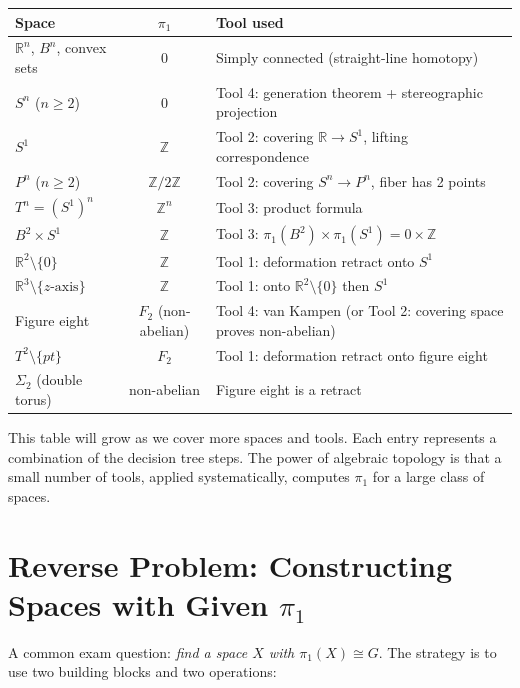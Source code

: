 \documentclass[11pt]{report}
\begin{document}
\begin{center}
\small
\begin{tabular}{|p{3.5cm}|c|p{5cm}|}
\hline
\textbf{Space} & $\pi_1$ & \textbf{Tool used} \\
\hline
$\mathbb{R}^n$, $B^n$, convex sets & $0$ & Simply connected (straight-line homotopy) \\
\hline
$S^n$ ($n \geq 2$) & $0$ & Tool 4: generation theorem + stereographic projection \\
\hline
$S^1$ & $\mathbb{Z}$ & Tool 2: covering $\mathbb{R} \to S^1$, lifting correspondence \\
\hline
$P^n$ ($n \geq 2$) & $\mathbb{Z}/2\mathbb{Z}$ & Tool 2: covering $S^n \to P^n$, fiber has 2 points \\
\hline
$T^n = (S^1)^n$ & $\mathbb{Z}^n$ & Tool 3: product formula \\
\hline
$B^2 \times S^1$ & $\mathbb{Z}$ & Tool 3: $\pi_1(B^2) \times \pi_1(S^1) = 0 \times \mathbb{Z}$ \\
\hline
$\mathbb{R}^2 \setminus \{0\}$ & $\mathbb{Z}$ & Tool 1: deformation retract onto $S^1$ \\
\hline
$\mathbb{R}^3 \setminus \{z\text{-axis}\}$ & $\mathbb{Z}$ & Tool 1: onto $\mathbb{R}^2 \setminus \{0\}$ then $S^1$ \\
\hline
Figure eight & $F_2$ (non-abelian) & Tool 4: van Kampen (or Tool 2: covering space proves non-abelian) \\
\hline
$T^2 \setminus \{pt\}$ & $F_2$ & Tool 1: deformation retract onto figure eight \\
\hline
$\Sigma_2$ (double torus) & non-abelian & Figure eight is a retract \\
\hline
\end{tabular}
\end{center}

\begin{rembox}
This table will grow as we cover more spaces and tools. Each entry represents a combination of the decision tree steps. The power of algebraic topology is that a small number of tools, applied systematically, computes $\pi_1$ for a large class of spaces.
\end{rembox}

\section{Reverse Problem: Constructing Spaces with Given $\pi_1$}

A common exam question: \emph{find a space $X$ with $\pi_1(X) \cong G$}. The strategy is to use two building blocks and two operations:
\end{document}
